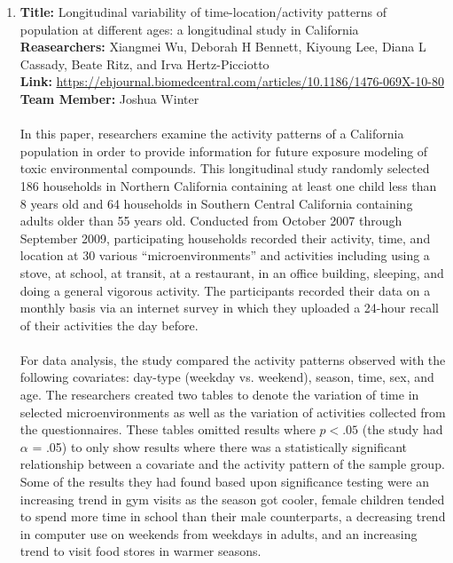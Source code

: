 \documentclass[letterpaper, 12 pt, conference]{article}
\begin{document}
\begin{enumerate}
    
    \item
     \textbf{Title: } Longitudinal variability of time-location/activity patterns of population at different ages: a longitudinal study in California
     \\ 
     \textbf{Reasearchers: } Xiangmei Wu, Deborah H Bennett, Kiyoung Lee, Diana L Cassady, Beate Ritz, and Irva Hertz-Picciotto
    \\
    \textbf{Link: } 
    \url{https://ehjournal.biomedcentral.com/articles/10.1186/1476-069X-10-80}
    \\
    \textbf{Team Member: } Joshua Winter
    \\\\
    In this paper, researchers examine the activity patterns of a California population in order to provide information for future exposure modeling of toxic environmental compounds. This longitudinal study randomly selected 186 households in Northern California containing at least one child less than 8 years old and 64 households in Southern Central California containing adults older than 55 years old. Conducted from October 2007 through September 2009, participating households recorded their activity, time, and location at 30 various “microenvironments” and activities including using a stove, at school, at transit, at a restaurant, in an office building, sleeping, and doing a general vigorous activity. The participants recorded their data on a monthly basis via an internet survey in which they uploaded a 24-hour recall of their activities the day before.
     \\\\
     For data analysis, the study compared the activity patterns observed with the following covariates: day-type (weekday vs. weekend), season, time, sex, and age. The researchers created two tables to denote the variation of time in selected microenvironments as well as the variation of activities collected from the questionnaires. These tables omitted results where $p < .05$ (the study had $\alpha$ = .05) to only show results where there was a statistically significant relationship between a covariate and the activity pattern of the sample group. Some of the results they had found based upon significance testing were an increasing trend in gym visits as the season got cooler, female children tended to spend more time in school than their male counterparts, a decreasing trend in computer use on weekends from weekdays in adults, and an increasing trend to visit food stores in warmer seasons.
    \\\\

\end{enumerate}
\end{document}
